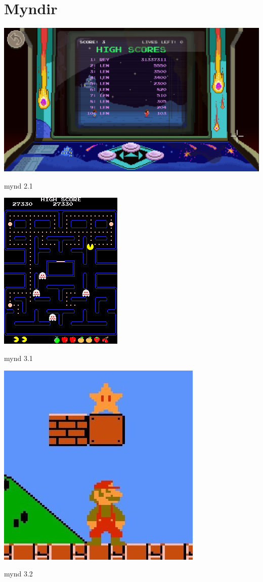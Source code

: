 \documentclass{article}
\begin{document}
\newpage
\section*{Myndir}
\begin{center}
    \includegraphics[scale=0.25]{imgs/highscore.png}
\end{center}
mynd 2.1

\begin{center}
    \includegraphics{imgs/pac-man.png}
\end{center}
mynd 3.1
\begin{center}
    \includegraphics[scale=0.8]{imgs/mario.jpg}
\end{center}
mynd 3.2
\end{document}
